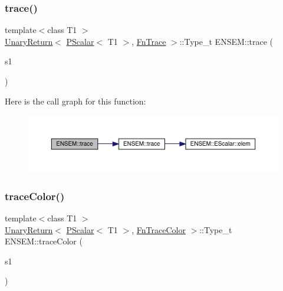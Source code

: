 \subsubsection{\texorpdfstring{trace()}{trace()}}
{\footnotesize\ttfamily template$<$class T1 $>$ \\
\mbox{\hyperlink{structENSEM_1_1UnaryReturn}{Unary\+Return}}$<$ \mbox{\hyperlink{classENSEM_1_1PScalar}{P\+Scalar}}$<$ T1 $>$, \mbox{\hyperlink{structENSEM_1_1FnTrace}{Fn\+Trace}} $>$\+::Type\+\_\+t E\+N\+S\+E\+M\+::trace (\begin{DoxyParamCaption}\item[{const \mbox{\hyperlink{classENSEM_1_1PScalar}{P\+Scalar}}$<$ T1 $>$ \&}]{s1 }\end{DoxyParamCaption})\hspace{0.3cm}{\ttfamily [inline]}}

Here is the call graph for this function\+:\nopagebreak
\begin{figure}[H]
\begin{center}
\leavevmode
\includegraphics[width=350pt]{db/dcc/group__primscalar_ga13a07d573bfefc0db7496d278c078a52_cgraph}
\end{center}
\end{figure}
\mbox{\label{group__primscalar_gaf9f8817942b8ea7583ac7146ede1508f}} 
\subsubsection{\texorpdfstring{traceColor()}{traceColor()}}
{\footnotesize\ttfamily template$<$class T1 $>$ \\
\mbox{\hyperlink{structENSEM_1_1UnaryReturn}{Unary\+Return}}$<$ \mbox{\hyperlink{classENSEM_1_1PScalar}{P\+Scalar}}$<$ T1 $>$, \mbox{\hyperlink{structENSEM_1_1FnTraceColor}{Fn\+Trace\+Color}} $>$\+::Type\+\_\+t E\+N\+S\+E\+M\+::trace\+Color (\begin{DoxyParamCaption}\item[{const \mbox{\hyperlink{classENSEM_1_1PScalar}{P\+Scalar}}$<$ T1 $>$ \&}]{s1 }\end{DoxyParamCaption})\hspace{0.3cm}{\ttfamily [inline]}}

